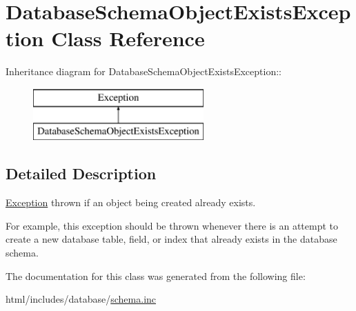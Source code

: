 \hypertarget{classDatabaseSchemaObjectExistsException}{
\section{DatabaseSchemaObjectExistsException Class Reference}
\label{classDatabaseSchemaObjectExistsException}
}
Inheritance diagram for DatabaseSchemaObjectExistsException::\begin{figure}[H]
\begin{center}
\leavevmode
\includegraphics[height=2cm]{classDatabaseSchemaObjectExistsException}
\end{center}
\end{figure}


\subsection{Detailed Description}
\hyperlink{classException}{Exception} thrown if an object being created already exists.

For example, this exception should be thrown whenever there is an attempt to create a new database table, field, or index that already exists in the database schema. 

The documentation for this class was generated from the following file:\begin{DoxyCompactItemize}
\item 
html/includes/database/\hyperlink{schema_8inc}{schema.inc}\end{DoxyCompactItemize}
